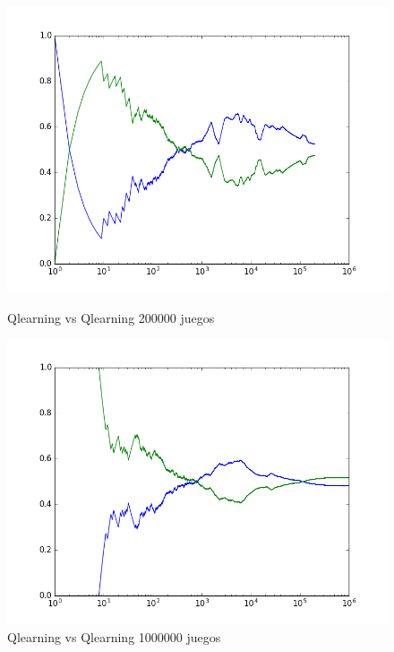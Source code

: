 \begin{figure}[h]
 \centering
 \begin{minipage}{.45\textwidth}	  
	\centering	
	\includegraphics[scale=0.35]{QlearningQlearningEgreedy200000.png}
        \caption{Qlearning vs Qlearning 200000 juegos}
  \end{minipage}
 \begin{minipage}{.5\textwidth} 
	\centering	
	\includegraphics[scale=0.35]{QlearningQlearningEgreedy1000000.png}
        \caption{Qlearning vs Qlearning 1000000 juegos}
  \end{minipage}
\end{figure}


